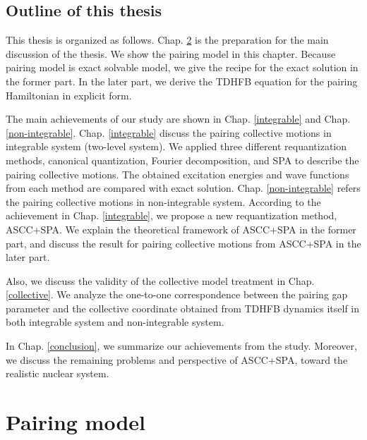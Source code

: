 \documentclass[11pt]{book} %
\begin{document}


\section{Outline of this thesis}
This thesis is organized as follows. Chap. \ref{chap2} is the preparation for the main discussion of the thesis. We show the pairing model in this chapter. Because pairing model is exact solvable model, we give the recipe for the exact solution in the former part. In the later part, we derive the TDHFB equation for the pairing Hamiltonian in explicit form. 

The main achievements of our study are shown in Chap. \ref{integrable} and Chap. \ref{non-integrable}. Chap. \ref{integrable} discuss the pairing collective motions in integrable system (two-level system). We applied three different requantization methods, canonical quantization, Fourier decomposition, and SPA to describe the pairing collective motions. The obtained excitation energies and wave functions from each method are compared with exact solution. Chap. \ref{non-integrable} refers the pairing collective motions in non-integrable system. According to the achievement in Chap. \ref{integrable}, we propose a new requantization method, ASCC+SPA. We explain the theoretical framework of ASCC+SPA in the former part, and discuss the result for pairing collective motions from ASCC+SPA in the later part.

Also, we discuss the validity of the collective model treatment in Chap. \ref{collective}. We analyze the one-to-one correspondence between the pairing gap parameter and the collective coordinate obtained from TDHFB dynamics itself in both integrable system and non-integrable system. 

In Chap. \ref{conclusion}, we summarize our achievements from the study. Moreover, we discuss the remaining problems and perspective of ASCC+SPA, toward the realistic nuclear system.





\clearpage{\pagestyle{empty}\cleardoublepage}
\chapter{Pairing model}
\label{chap2}
\end{document}

